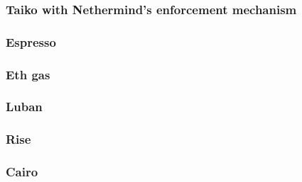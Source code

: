 \documentclass[a4paper]{article}
\theoremstyle{boldstyle}
\begin{document}
        \subsubsection{ \textbf{Taiko with Nethermind's enforcement mechanism}}
        
        \subsubsection{ \textbf{Espresso}}
        
        \subsubsection{ \textbf{Eth gas}}
        
        \subsubsection{ \textbf{Luban}}
        
        \subsubsection{ \textbf{Rise}}
        
        \subsubsection{ \textbf{Cairo}}
        
\end{document}
